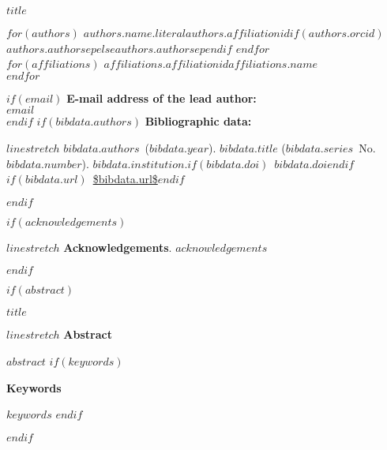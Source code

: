 
\begin{titlepage}
\thispagestyle{titlepage}

\begin{center}
\vspace{72pt}
\begin{doublespace}
\fontsize{18pt}{0}
\textbf{$title$}\\
\end{doublespace}
\vspace{30pt}
\textit{
    \fontsize{14pt}{0}\selectfont
    $for(authors)$
    $authors.name.literal$$authors.affiliationid$$if(authors.orcid)$\ $authors.authorsep$$else$$authors.authorsep$$endif$
    $endfor$
}
\\ \vspace{12pt}
\textit{
    \fontsize{14pt}{0}\selectfont
    $for(affiliations)$
    $affiliations.affiliationid$$affiliations.name$\\ \vspace{5pt}
    $endfor$
}
\vspace{36pt}
\end{center}
\vspace{48pt}
\begin{flushleft}
$if(email)$
\textbf{E-mail address of the lead author:}\\
\vspace{6pt}
$email$ \\
\vspace{12pt}
$endif$
$if(bibdata.authors)$
\textbf{Bibliographic data:}\\
\vspace{6pt} %
\begin{spacing}{$linestretch$}
$bibdata.authors$~($bibdata.year$). \textit{$bibdata.title$} ($bibdata.series$\ No.~$bibdata.number$). $bibdata.institution$.$if(bibdata.doi)$\ $bibdata.doi$$endif$$if(bibdata.url)$\ \url{$bibdata.url$}$endif$
\end{spacing}
$endif$
\end{flushleft}

\vfill

$if(acknowledgements)$
\begin{spacing}{$linestretch$}
\textbf{Acknowledgements}.
$acknowledgements$
\end{spacing}
$endif$
\end{titlepage}


$if(abstract)$
\newpage
\pagestyle{scrheadings}
\begin{doublespace}
\fontsize{18pt}{0}
\textbf{$title$}\\
\end{doublespace}

\begin{spacing}{$linestretch$}
\textbf{Abstract}

$abstract$
$if(keywords)$

\textbf{Keywords}

$keywords$
$endif$
\end{spacing}
$endif$

\newpage
